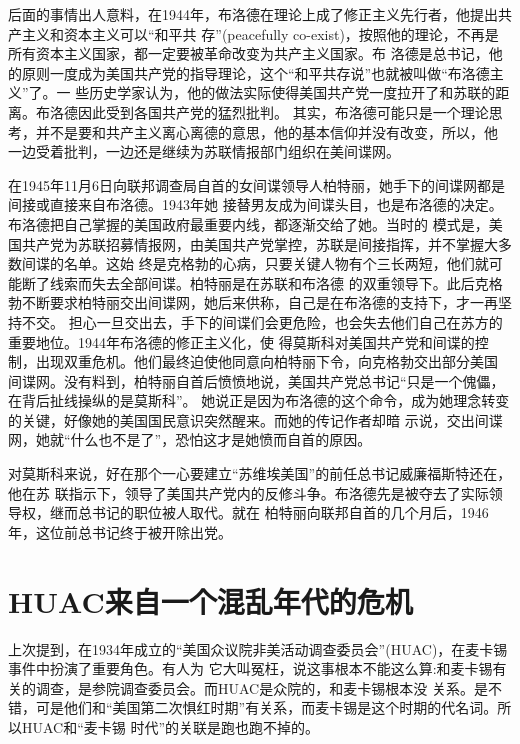 \documentclass[10pt]{article}
\begin{document}
{后面的事情出人意料，在1944年，布洛德在理论上成了修正主义先行者，他提出共产主义和资本主义可以``和平共
存''(peacefully co-exist)，按照他的理论，不再是所有资本主义国家，都一定要被革命改变为共产主义国家。布
洛德是总书记，他的原则一度成为美国共产党的指导理论，这个``和平共存说''也就被叫做``布洛德主义''了。一
些历史学家认为，他的做法实际使得美国共产党一度拉开了和苏联的距离。布洛德因此受到各国共产党的猛烈批判。
其实，布洛德可能只是一个理论思考，并不是要和共产主义离心离德的意思，他的基本信仰并没有改变，所以，他
一边受着批判，一边还是继续为苏联情报部门组织在美间谍网。

在1945年11月6日向联邦调查局自首的女间谍领导人柏特丽，她手下的间谍网都是间接或直接来自布洛德。1943年她
接替男友成为间谍头目，也是布洛德的决定。布洛德把自己掌握的美国政府最重要内线，都逐渐交给了她。当时的
模式是，美国共产党为苏联招募情报网，由美国共产党掌控，苏联是间接指挥，并不掌握大多数间谍的名单。这始
终是克格勃的心病，只要关键人物有个三长两短，他们就可能断了线索而失去全部间谍。柏特丽是在苏联和布洛德
的双重领导下。此后克格勃不断要求柏特丽交出间谍网，她后来供称，自己是在布洛德的支持下，才一再坚持不交。
担心一旦交出去，手下的间谍们会更危险，也会失去他们自己在苏方的重要地位。1944年布洛德的修正主义化，使
得莫斯科对美国共产党和间谍的控制，出现双重危机。他们最终迫使他同意向柏特丽下令，向克格勃交出部分美国
间谍网。没有料到，柏特丽自首后愤愤地说，美国共产党总书记``只是一个傀儡，在背后扯线操纵的是莫斯科''。
她说正是因为布洛德的这个命令，成为她理念转变的关键，好像她的美国国民意识突然醒来。而她的传记作者却暗
示说，交出间谍网，她就``什么也不是了''，恐怕这才是她愤而自首的原因。

对莫斯科来说，好在那个一心要建立``苏维埃美国''的前任总书记威廉\textperiodcentered 福斯特还在，他在苏
联指示下，领导了美国共产党内的反修斗争。布洛德先是被夺去了实际领导权，继而总书记的职位被人取代。就在
柏特丽向联邦自首的几个月后，1946年，这位前总书记终于被开除出党。

\pagebreak
\section{HUAC来自一个混乱年代的危机}

上次提到，在1934年成立的``美国众议院非美活动调查委员会''(HUAC)，在麦卡锡事件中扮演了重要角色。有人为
它大叫冤枉，说这事根本不能这么算:和麦卡锡有关的调查，是参院调查委员会。而HUAC是众院的，和麦卡锡根本没
关系。是不错，可是他们和``美国第二次惧红时期''有关系，而麦卡锡是这个时期的代名词。所以HUAC和``麦卡锡
时代''的关联是跑也跑不掉的。

}
\end{document}
